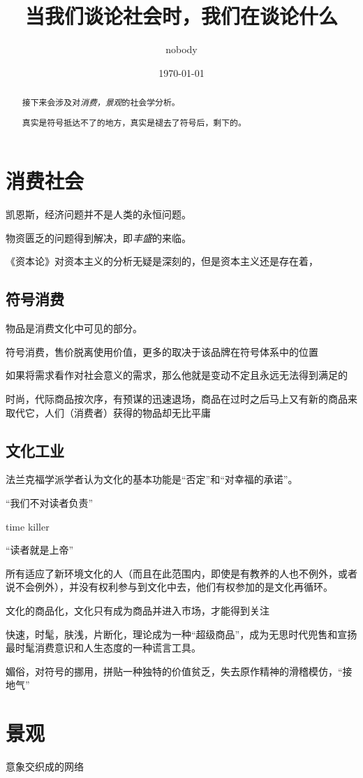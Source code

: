 \documentclass[UTF8]{article}
\title{当我们谈论社会时，我们在谈论什么}
\author{nobody}
\date{\today}
\begin{document}
\maketitle
\begin{abstract}
接下来会涉及对\emph{消费，景观}的社会学分析。

真实是符号抵达不了的地方，真实是褪去了符号后，剩下的。
\end{abstract}
\section{消费社会}
凯恩斯，经济问题并不是人类的永恒问题。

物资匮乏的问题得到解决，即\emph{丰盛}的来临。

《资本论》对资本主义的分析无疑是深刻的，但是资本主义还是存在着，
\subsection{符号消费}
物品是消费文化中可见的部分。

符号消费，售价脱离使用价值，更多的取决于该品牌在符号体系中的位置

如果将需求看作对社会意义的需求，那么他就是变动不定且永远无法得到满足的

时尚，代际商品按次序，有预谋的迅速退场，商品在过时之后马上又有新的商品来取代它，人们（消费者）获得的物品却无比平庸

\subsection{文化工业}
法兰克福学派学者认为文化的基本功能是“否定”和“对幸福的承诺”。

“我们不对读者负责”

time killer

“读者就是上帝”

所有适应了新环境文化的人（而且在此范围内，即使是有教养的人也不例外，或者说不会例外），并没有权利参与到文化中去，他们有权参加的是文化再循环。

文化的商品化，文化只有成为商品并进入市场，才能得到关注

快速，时髦，肤浅，片断化，理论成为一种“超级商品”，成为无思时代兜售和宣扬最时髦消费意识和人生态度的一种谎言工具。

媚俗，对符号的挪用，拼贴一种独特的价值贫乏，失去原作精神的滑稽模仿，“接地气”

\section{景观}
意象交织成的网络
\end{document}

